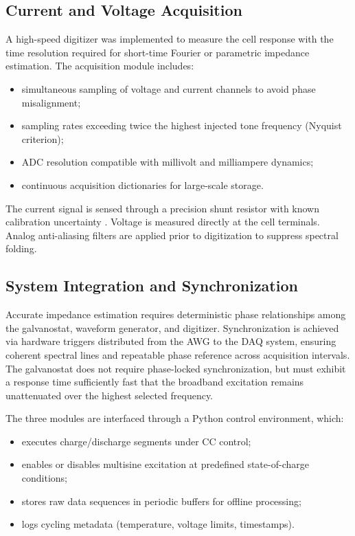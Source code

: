\subsection{Current and Voltage Acquisition}

A high-speed digitizer was implemented to measure the cell response with the time resolution required for short-time Fourier or parametric impedance estimation. The acquisition module includes:
\begin{itemize}
    \item simultaneous sampling of voltage and current channels to avoid phase misalignment;
    \item sampling rates exceeding twice the highest injected tone frequency (Nyquist criterion);
    \item ADC resolution compatible with millivolt and milliampere dynamics;
    \item continuous acquisition dictionaries for large-scale storage.
\end{itemize}
The current signal is sensed through a precision shunt resistor with known calibration uncertainty \cite{}. Voltage is measured directly at the cell terminals. Analog anti-aliasing filters are applied prior to digitization to suppress spectral folding.

\subsection{System Integration and Synchronization}

Accurate impedance estimation requires deterministic phase relationships among the galvanostat, waveform generator, and digitizer. Synchronization is achieved via hardware triggers distributed from the AWG to the DAQ system, ensuring coherent spectral lines and repeatable phase reference across acquisition intervals. The galvanostat does not require phase-locked synchronization, but must exhibit a response time sufficiently fast that the broadband excitation remains unattenuated over the highest selected frequency.

The three modules are interfaced through a Python control environment, which:
\begin{itemize}
    \item executes charge/discharge segments under CC control;
    \item enables or disables multisine excitation at predefined state-of-charge conditions;
    \item stores raw data sequences in periodic buffers for offline processing;
    \item logs cycling metadata (temperature, voltage limits, timestamps).
\end{itemize}

